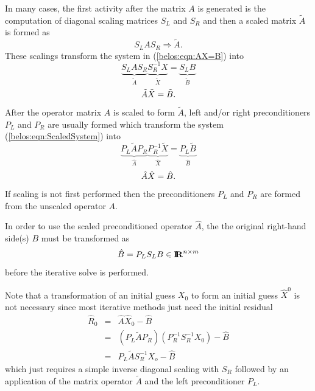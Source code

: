 \documentclass[pdf,ps2pdf,11pt]{SANDreport}
\begin{document}
In many cases, the first activity after the matrix $A$ is generated is
the computation of diagonal scaling matrices $S_L$ and $S_R$ and then
a scaled matrix $\tilde{A}$ is formed as
%
\begin{equation}
S_L A S_R \Rightarrow \tilde{A}.
\label{belos:eqn:A_tilde}
\end{equation}
%
These scalings transform the system in ({}\ref{belos:eqn:AX=B}) into
%
\[
\underbrace{S_L A S_R}_{\displaystyle{\tilde{A}}}
\underbrace{S_R^{-1} X}_{\displaystyle{\tilde{X}}}
=
\underbrace{S_L B}_{\displaystyle{\tilde{B}}}
\]
%
\begin{equation}
\nonumber \\
\tilde{A} \tilde{X}  = \tilde{B}.
\label{belos:eqn:ScaledSystem}
\end{equation}
%
After the operator matrix $A$ is scaled to form $\tilde{A}$, left
and/or right preconditioners $P_L$ and $P_R$ are usually formed which
transform the system ({}\ref{belos:eqn:ScaledSystem}) into
%
\[
\underbrace{P_L \tilde{A} P_R}_{\displaystyle{\hat{A}}}
\underbrace{P_R^{-1} \tilde{X}}_{\displaystyle{\hat{X}}}
=
\underbrace{P_L \tilde{B}}_{\displaystyle{\hat{B}}}
\]
%
\begin{equation}
\nonumber \\
\hat{A} \hat{X}  = \hat{B}.
\label{belos:eqn:PreconditionedSystem}
\end{equation}
%
If scaling is not first performed then the preconditioners $P_L$ and
$P_R$ are formed from the unscaled operator $A$.

In order to use the scaled preconditioned operator $\hat{A}$, the the
original right-hand side(s) $B$ must be transformed as
%
\begin{equation}
\hat{B} = P_L S_L B \in \mbox{\textbf{I}}\hspace{-0.6ex}\mbox{\textbf{R}}^{n \times m}
\label{B-preprocess}
\end{equation}
%
{}\noindent{}before the iterative solve is performed.

Note that a transformation of an initial guess $X_0$ to form an
initial guess $\hat{X}^0$ is not necessary since most iterative
methods just need the initial residual
%
\begin{eqnarray}
\hat{R}_0
& = & \hat{A} \hat{X}_0 - \hat{B}
\nonumber \\
& = & \left( P_L \tilde{A} P_R \right) \left( P_R^{-1} S_R^{-1} X_0 \right) - \hat{B}
\nonumber \\
& = & P_L \tilde{A} S_R^{-1} X_o - \hat{B}
\label{belos:eqn:R_hat_0}
\end{eqnarray}
%
{}\noindent{}which just requires a simple inverse diagonal scaling
with $S_R$ followed by an application of the matrix operator
$\tilde{A}$ and the left preconditioner $P_L$.
\end{document}
